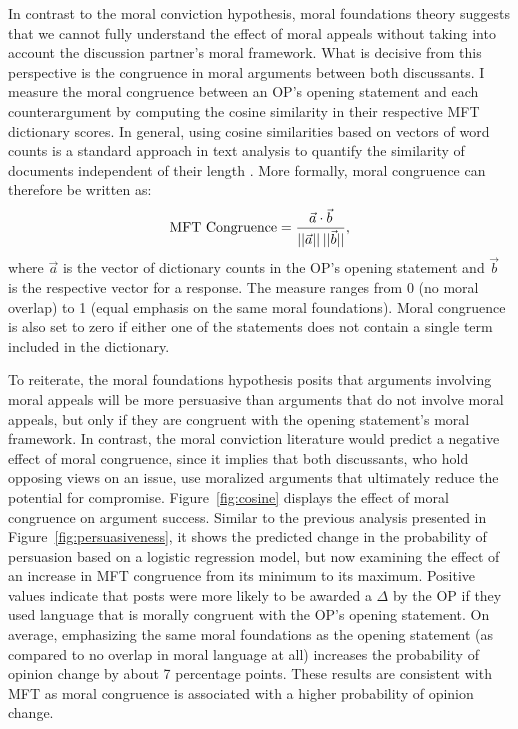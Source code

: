In contrast to the moral conviction hypothesis, moral foundations theory suggests that we cannot fully understand the effect of moral appeals without taking into account the discussion partner's moral framework.  What is decisive from this perspective is the congruence in moral arguments between both discussants. I measure the moral congruence between an OP's opening statement and each counterargument by computing the cosine similarity in their respective MFT dictionary scores. In general, using cosine similarities based on vectors of word counts is a standard approach in text analysis to quantify the similarity of documents independent of their length \citep[e.g.,][]{manning2008introduction}. More formally, moral congruence can therefore be written as:
\begin{equation}
\text{MFT Congruence}=\dfrac{\vec{a}\cdot \vec{b}}{||\vec{a}||\hspace{.2em}||\vec{b}||},
\end{equation}
where $\vec{a}$ is the vector of dictionary counts in the OP's opening statement and $\vec{b}$ is the respective vector for a response. The measure ranges from 0 (no moral overlap) to 1 (equal emphasis on the same moral foundations). Moral congruence is also set to zero if either one of the statements does not contain a single term included in the dictionary.

To reiterate, the moral foundations hypothesis posits that arguments involving moral appeals will be more persuasive than arguments that do not involve moral appeals, but only if they are congruent with the opening statement's moral framework. In contrast, the moral conviction literature would predict a negative effect of moral congruence, since it implies that both discussants, who hold opposing views on an issue, use moralized arguments that ultimately reduce the potential for compromise. Figure~\ref{fig:cosine} displays the effect of moral congruence on argument success. Similar to the previous analysis presented in Figure~\ref{fig:persuasiveness}, it shows the predicted change in the probability of persuasion based on a logistic regression model, but now examining the effect of an increase in MFT congruence from its minimum to its maximum. Positive values indicate that posts were more likely to be awarded a $\Delta$ by the OP if they used language that is morally congruent with the OP's opening statement. On average, emphasizing the same moral foundations as the opening statement (as compared to no overlap in moral language at all) increases the probability of opinion change by about 7 percentage points. These results are consistent with MFT as moral congruence is associated with a higher probability of opinion change.

